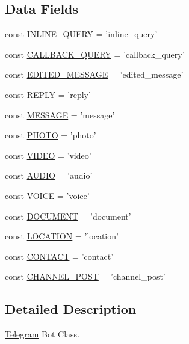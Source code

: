 \subsection*{Data Fields}
\begin{DoxyCompactItemize}
\item 
const \hyperlink{class_telegram_aea04c33722ec566f4d25049ed3e749f8}{I\-N\-L\-I\-N\-E\-\_\-\-Q\-U\-E\-R\-Y} = 'inline\-\_\-query'
\item 
const \hyperlink{class_telegram_a464a4a095bb928388381b33e0babf9fe}{C\-A\-L\-L\-B\-A\-C\-K\-\_\-\-Q\-U\-E\-R\-Y} = 'callback\-\_\-query'
\item 
const \hyperlink{class_telegram_aa469cc007db1409d59a5e5bfac0633ec}{E\-D\-I\-T\-E\-D\-\_\-\-M\-E\-S\-S\-A\-G\-E} = 'edited\-\_\-message'
\item 
const \hyperlink{class_telegram_acb63774895b195d4c22afe2b089a3ddd}{R\-E\-P\-L\-Y} = 'reply'
\item 
const \hyperlink{class_telegram_af9b451d04eb24044a2d4112be10de570}{M\-E\-S\-S\-A\-G\-E} = 'message'
\item 
const \hyperlink{class_telegram_a0aeb08e94e66f9d958f565530b6b6a80}{P\-H\-O\-T\-O} = 'photo'
\item 
const \hyperlink{class_telegram_a333a9b0a1034beea1b4b505f30885cea}{V\-I\-D\-E\-O} = 'video'
\item 
const \hyperlink{class_telegram_a9f6cfe013372d7de1568a95c871214d1}{A\-U\-D\-I\-O} = 'audio'
\item 
const \hyperlink{class_telegram_a12e48e3d10ee66d0a6ca34c207d8e282}{V\-O\-I\-C\-E} = 'voice'
\item 
const \hyperlink{class_telegram_a6494d627239bf203e03297843bf52053}{D\-O\-C\-U\-M\-E\-N\-T} = 'document'
\item 
const \hyperlink{class_telegram_aca699735a6cec340e45cde5c623bdb32}{L\-O\-C\-A\-T\-I\-O\-N} = 'location'
\item 
const \hyperlink{class_telegram_aac7f4f1b55319f64ad56ae8a8222d9b5}{C\-O\-N\-T\-A\-C\-T} = 'contact'
\item 
const \hyperlink{class_telegram_a017c4bf971da66fae8b480ba38f2c44c}{C\-H\-A\-N\-N\-E\-L\-\_\-\-P\-O\-S\-T} = 'channel\-\_\-post'
\end{DoxyCompactItemize}


\subsection{Detailed Description}
\hyperlink{class_telegram}{Telegram} Bot Class.

